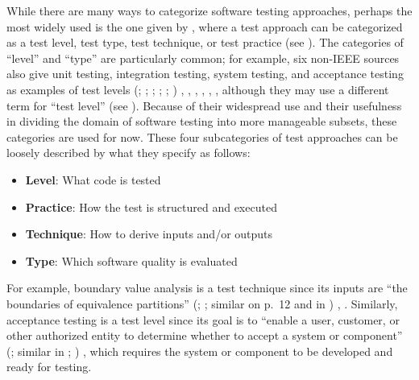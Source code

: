 While there are many ways to categorize software testing approaches, perhaps
the most widely used is the one given by \ifnotpaper\else \citeauthor{IEEE2022}
\fi \citet{IEEE2022}, where a test approach can be categorized as a test level,
test type, test technique, or test practice (see ).
The categories of ``level'' and ``type'' are particularly common; for example,
six non-IEEE sources also give unit testing, integration testing,
system testing, and acceptance testing as examples of test levels \ifnotpaper
    (\citealp[pp.~5\=/6 to 5\=/7]{SWEBOK2024}; \citealpISTQB{};
    \citealp[pp.~807--808]{Perry2006}; \citealp[pp.~443--445]{PetersAndPedrycz2000};
    \citealp[p.~218]{KuļešovsEtAl2013};
    \citealp[pp.~9, 13]{Gerrard2000a})\else
    \cite[pp.~443--445]{PetersAndPedrycz2000}, \cite{ISTQB},
    \cite[pp.~5\=/6 to 5\=/7]{SWEBOK2024}, \cite[pp.~9, 13]{Gerrard2000a},
    \cite[pp.~807--808]{Perry2006}, \cite[p.~218]{KuļešovsEtAl2013}%
    \fi, although they may use a different term for ``test
level'' (see ). Because of their widespread use and
their usefulness in dividing the domain of software testing into more
manageable subsets, these categories are used for now. These four subcategories
of test approaches can be loosely described by what they specify as
follows:
\begin{itemize}
    \item \textbf{Level}: What code is tested
    \item \textbf{Practice}: How the test is structured and executed
    \item \textbf{Technique}: How to derive inputs and/or outputs
    \item \textbf{Type}: Which software quality is evaluated
\end{itemize}
For example, boundary value analysis is a test technique since its inputs are
``the boundaries of equivalence partitions'' \ifnotpaper
    (\citealp[p.~2]{IEEE2022}; \citeyear[p.~1]{IEEE2021}; similar on p.~12 and
    in \citealpISTQB{})%
\else
    \cite[p.~2]{IEEE2022}, \cite[p.~1]{IEEE2021}%
\fi. Similarly, acceptance testing is a test level since its goal is to
``enable a user, customer, or other authorized entity to determine whether to
accept a system or component'' \ifnotpaper (\citealp[p.~5]{IEEE2017}; similar
    in \citeyear[p.~6]{IEEE2021}; \citealp[p.~344]{SakamotoEtAl2013})\else
    \cite[p.~5]{IEEE2017}\fi, which requires the system or component to be
developed and ready for testing.

